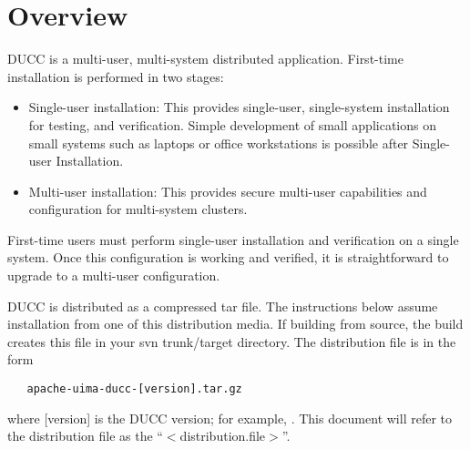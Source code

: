 % 
% 
% 
% 
\section{Overview}

DUCC is a multi-user, multi-system distributed application.  First-time installation is performed in
two stages:

\begin{itemize}
    \item Single-user installation: This provides single-user, single-system installation for testing,
      and verification. Simple development of small applications on small systems such as laptops or
      office workstations is possible after Single-user Installation.
      
    \item Multi-user installation: This provides secure multi-user capabilities and configuration
      for multi-system clusters.
\end{itemize}

First-time users must perform single-user installation and verification on a single system.  Once
this configuration is working and verified, it is straightforward to upgrade to a multi-user
configuration.

DUCC is distributed as a compressed tar file.  The instructions below assume installation from one
of this distribution media.  If building from source, the build creates this file in your svn
trunk/target directory. The distribution file is in the form
\begin{verbatim}
   apache-uima-ducc-[version].tar.gz
\end{verbatim}
where [version] is the DUCC version; for example, {\em \distro}.  This document will refer to the distribution
file as the ``$<$distribution.file$>$''.

